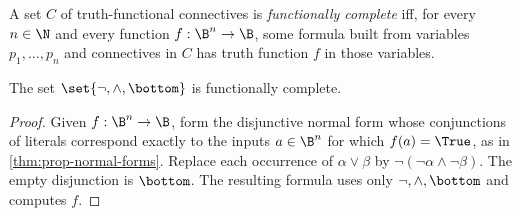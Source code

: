 \begin{definition}
A set \(C\) of truth-functional connectives is \emph{functionally complete}
iff, for every \(n\in\N\) and every function \(f:\B^n\to\B\), some formula
built from variables \(p_1,\ldots,p_n\) and connectives in \(C\) has truth
function \(f\) in those variables.
\end{definition}

\begin{theorem}
The set \(\set{\neg,\land,\bottom}\) is functionally complete.
\end{theorem}
\begin{proof}
Given \(f:\B^n\to\B\), form the disjunctive normal form whose conjunctions of
literals correspond exactly to the inputs \(a\in\B^n\) for which
\(f(a)=\True\), as in \cref{thm:prop-normal-forms}.  Replace each occurrence
of \(\alpha\lor\beta\) by
\(\neg(\neg\alpha\land\neg\beta)\).  The empty disjunction is \(\bottom\).
The resulting formula uses only \(\neg,\land,\bottom\) and computes \(f\).
\end{proof}
